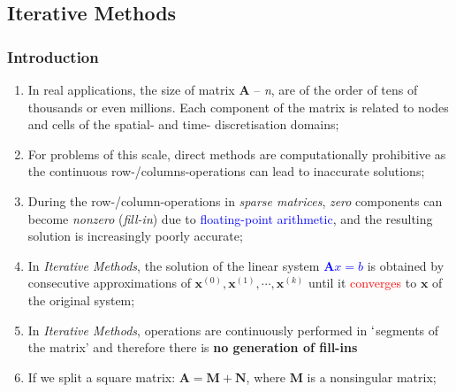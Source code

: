 \documentclass[10pt,compress,handout,ignorenonframetext]{beamer}
\begin{document}
\subsection{Iterative Methods}
\begin{frame}
  \frametitle{Introduction} 
  \begin{enumerate}
     \item <1-> In real applications, the size of matrix $\bm{A}$ -- {\it n}, are of the order of tens of thousands or even millions. Each component of the matrix is related to nodes and cells of the spatial- and time- discretisation domains;
     \item <2-> For problems of this scale, direct methods are computationally prohibitive as the continuous row-/columns-operations can lead to inaccurate solutions;
     \item <3-> During the row-/column-operations in {\it sparse matrices}, {\it zero} components can become {\it nonzero} ({\it fill-in}) due to \textcolor{blue}{floating-point arithmetic}, and the resulting solution is increasingly poorly accurate;
     \item <4-> In {\it Iterative Methods}, the solution of the linear system \textcolor{blue}{$\bm{A}x=b$} is obtained by consecutive approximations of $\bm{x}^{(0)},\bm{x}^{(1)},\cdots,\bm{x}^{(k)}$ until it \textcolor{red}{converges} to $\bm{x}$ of the original system;  
     \item <5-> In {\it Iterative Methods}, operations are continuously performed in $\lq$segments of the matrix' and therefore there is {\bf no generation of fill-ins} 
     \item <6-> If we split a square matrix: $\bm{A}=\bm{M}+\bm{N}$, where $\bm{M}$ is a nonsingular matrix;
  \end{enumerate}
\end{frame}
\end{document}
